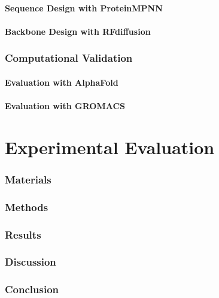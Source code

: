 \documentclass[12pt]{article}
\begin{document}
\subsection{Sequence Design with ProteinMPNN}\label{ch:pmpnn}

\FloatBarrier

\subsection{Backbone Design with RFdiffusion}\label{ch:rfdiffusion}

\FloatBarrier

\section{Computational Validation}\label{ch:design_evaluation}
\subsection{Evaluation with AlphaFold}\label{ch:alphafold}

\FloatBarrier

\subsection{Evaluation with GROMACS}\label{ch:gromacs}

\FloatBarrier

\clearpage
\part{Experimental Evaluation}
\section{Materials}\label{ch:materials}


\section{Methods}\label{ch:methods}


\section{Results}\label{ch:results}


\section{Discussion}\label{ch:discussion}


\section{Conclusion}\label{ch:conclusion}


\clearpage
\printbibliography

\clearpage


\clearpage

\end{document}
